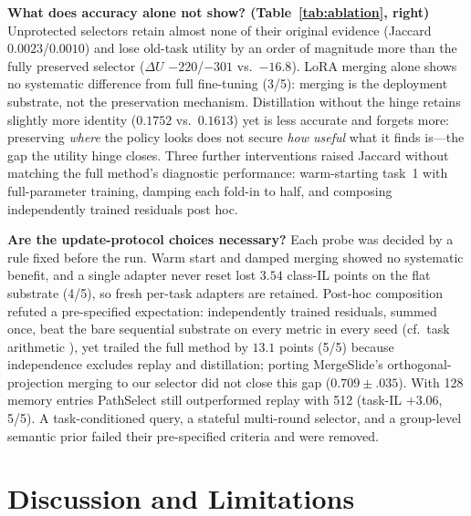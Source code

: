 \documentclass{article}
\begin{document}
\textbf{What does accuracy alone not show? (Table~\ref{tab:ablation}, right)}
Unprotected selectors retain almost none of their original evidence (Jaccard $0.0023$/$0.0010$) and lose old-task utility by an order of magnitude more than the fully preserved selector ($\Delta U$ $-220$/$-301$ vs.\ $-16.8$). LoRA merging alone shows no systematic difference from full fine-tuning (3/5): merging is the deployment substrate, not the preservation mechanism. Distillation without the hinge retains slightly more identity ($0.1752$ vs.\ $0.1613$) yet is less accurate and forgets more: preserving \emph{where} the policy looks does not secure \emph{how useful} what it finds is---the gap the utility hinge closes. Three further interventions raised Jaccard without matching the full method's diagnostic performance: warm-starting task~1 with full-parameter training, damping each fold-in to half, and composing independently trained residuals post hoc.

\textbf{Are the update-protocol choices necessary?}
Each probe was decided by a rule fixed before the run. Warm start and damped merging showed no systematic benefit, and a single adapter never reset lost $3.54$ class-IL points on the flat substrate (4/5), so fresh per-task adapters are retained. Post-hoc composition refuted a pre-specified expectation: independently trained residuals, summed once, beat the bare sequential substrate on every metric in every seed (cf.\ task arithmetic \cite{ilharco2023task}), yet trailed the full method by $13.1$ points (5/5) because independence excludes replay and distillation; porting MergeSlide's orthogonal-projection merging \cite{bui2026mergeslide} to our selector did not close this gap ($0.709{\pm}.035$). With 128 memory entries PathSelect still outperformed replay with 512 (task-IL $+3.06$, 5/5). A task-conditioned query, a stateful multi-round selector, and a group-level semantic prior failed their pre-specified criteria and were removed.

\FloatBarrier
\section{Discussion and Limitations}
\label{sec:discussion}
\end{document}
